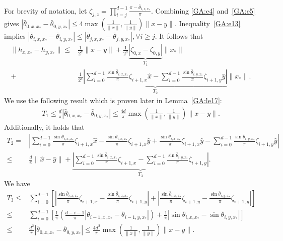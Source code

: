 For brevity of notation, let $\zeta_{j, z} = \prod_{i = j}^{d - 1} \frac{\pi - \bar{\theta}_{i, z, x_*}}{\pi}$.
Combining \eqref{GA:e4} and~\eqref{GA:e5} gives $|\bar{\theta}_{0, x, x_*} - \bar{\theta}_{0, y, x_*}| \leq 4 \max\left( \frac{1}{\|x\|}, \frac{1}{\|y\|} \right) \|x - y\|$.
Inequality~\eqref{GA:e13} implies $|\bar{\theta}_{i, x, x_*} - \bar{\theta}_{i, y, x_*}| \leq |\bar{\theta}_{j, x, x_*} - \bar{\theta}_{j, y, x_*}|, \forall i \geq j$.
It follows that
\begin{align}
\|h_{x, x_*} - h_{y, x_*}\| \leq& \frac{1}{2^d}\|x - y\| + \frac{1}{2^d} \underbrace{\left| \zeta_{0, x} - \zeta_{0, y} \right|}_{T_1} \|x_*\| \nonumber \\
+& \frac{1}{2^d} \underbrace{ \left| \sum_{i = 0}^{d - 1} \frac{\sin \bar{\theta}_{i, x, x_*}}{\pi} \zeta_{i + 1, x} \hat{x} - \sum_{i = 0}^{d - 1} \frac{\sin \bar{\theta}_{i, y, x_*}}{\pi} \zeta_{i + 1, y} \hat{y} \right| }_{T_2} \|x_*\|. \label{GA:e50}
\end{align}
We use the following result which is proven later in Lemma~\ref{GA:le17}:
\begin{align} \label{GA:e53}
T_1 \leq \frac{d}{\pi} |\bar{\theta}_{0, x, x_*} - \bar{\theta}_{0, y, x_*}| \leq \frac{4 d}{\pi}\max\left( \frac{1}{\|x\|}, \frac{1}{\|y\|} \right) \|x - y\|.
\end{align}
Additionally, it holds that
\begin{align}
T_2 =& \left| \sum_{i = 0}^{d - 1} \frac{\sin \bar{\theta}_{i, x, x_*}}{\pi} \zeta_{i + 1, x} \hat{x} - \frac{\sin \bar{\theta}_{i, x, x_*}}{\pi} \zeta_{i + 1, x} \hat{y} + \frac{\sin \bar{\theta}_{i, x, x_*}}{\pi} \zeta_{i + 1, x} \hat{y} - \sum_{i = 0}^{d - 1} \frac{\sin \bar{\theta}_{i, y, x_*}}{\pi} \zeta_{i + 1, y} \hat{y} \right| \nonumber \\
\leq& \frac{d}{\pi} \|\hat{x} - \hat{y}\| + \underbrace{ \left| \sum_{i = 0}^{d - 1} \frac{\sin \bar{\theta}_{i, x, x_*}}{\pi} \zeta_{i + 1, x} - \sum_{i = 0}^{d - 1} \frac{\sin \bar{\theta}_{i, y, x_*}}{\pi} \zeta_{i + 1, y} \right|}_{T_3} . \label{GA:e51}
\end{align}
We have
\begin{align}
T_3 \leq& \sum_{i = 0}^{d - 1} \left[ \left| \frac{\sin \bar{\theta}_{i, x, x_*}}{\pi} \zeta_{i + 1, x} -\frac{\sin \bar{\theta}_{i, x, x_*}}{\pi} \zeta_{i + 1, y} \right|\right. + \left.\left| \frac{\sin \bar{\theta}_{i, x, x_*}}{\pi} \zeta_{i + 1, y} - \frac{\sin \bar{\theta}_{i, y, x_*}}{\pi} \zeta_{i + 1, y} \right| \right] \nonumber \\
\leq& \sum_{i = 0}^{d - 1} \left[ \frac{1}{\pi} \left( \frac{d - i  - 1}{\pi} \left|\bar{\theta}_{i-1, x, x_*} - \bar{\theta}_{i-1, y, x_*}\right| \right) + \frac{1}{\pi} |\sin \bar{\theta}_{i, x, x_*} - \sin \bar{\theta}_{i, y, x_*}|  \right] \nonumber \\
\leq& \frac{d^2}{\pi} |\bar{\theta}_{0, x, x_*} - \bar{\theta}_{0, y, x_*}| \leq \frac{4 d^2}{\pi} \max\left(\frac{1}{\|x\|}, \frac{1}{\|y\|}\right) \|x - y\|. \label{GA:e52}
\end{align}
